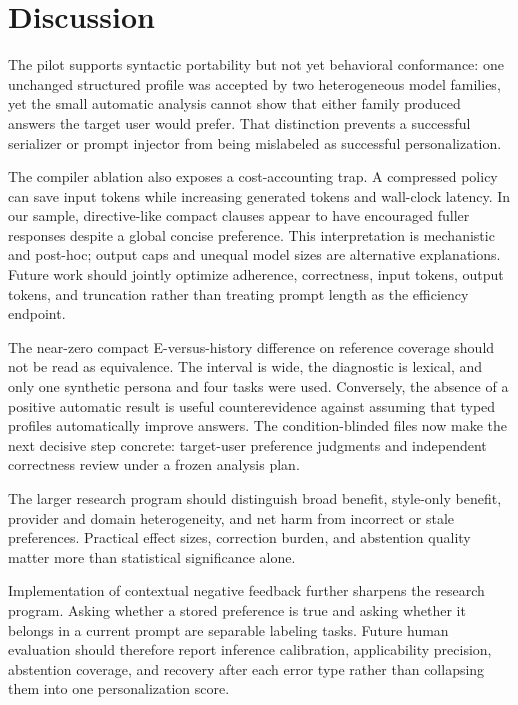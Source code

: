 \section{Discussion}
\label{sec:discussion}

The pilot supports syntactic portability but not yet behavioral conformance: one
unchanged structured profile was accepted by two heterogeneous model families,
yet the small automatic analysis cannot show that either family produced answers
the target user would prefer. That distinction prevents a successful serializer
or prompt injector from being mislabeled as successful personalization.

The compiler ablation also exposes a cost-accounting trap. A compressed policy can
save input tokens while increasing generated tokens and wall-clock latency. In our
sample, directive-like compact clauses appear to have encouraged fuller responses
despite a global concise preference. This interpretation is mechanistic and
post-hoc; output caps and unequal model sizes are alternative explanations. Future
work should jointly optimize adherence, correctness, input tokens, output tokens,
and truncation rather than treating prompt length as the efficiency endpoint.

The near-zero compact E-versus-history difference on reference coverage should not
be read as equivalence. The interval is wide, the diagnostic is lexical, and only
one synthetic persona and four tasks were used. Conversely, the absence of a
positive automatic result is useful counterevidence against assuming that typed
profiles automatically improve answers. The condition-blinded files now make the
next decisive step concrete: target-user preference judgments and independent
correctness review under a frozen analysis plan.

The larger research program should distinguish broad benefit, style-only benefit,
provider and domain heterogeneity, and net harm from incorrect or stale preferences.
Practical effect sizes, correction burden, and abstention quality matter more than
statistical significance alone.

Implementation of contextual negative feedback further sharpens the research
program. Asking whether a stored preference is true and asking whether it belongs
in a current prompt are separable labeling tasks. Future human evaluation should
therefore report inference calibration, applicability precision, abstention
coverage, and recovery after each error type rather than collapsing them into one
personalization score.
